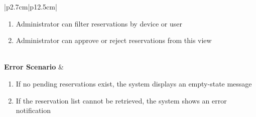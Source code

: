 \begin{table}[H]
\begin{tabular}{|p{2.7cm}|p{12.5cm}|}
\begin{minipage}[t]{\linewidth}
\begin{enumerate}[topsep=0pt,itemsep=1pt,parsep=0pt,partopsep=0pt]
                                          \item Administrator can filter reservations by device or user
                                          \item Administrator can approve or reject reservations from this view
                                      \end{enumerate}
                                  \end{minipage}      \\
        \hline
        \textbf{Error Scenario} & \begin{minipage}[t]{\linewidth}
                                      \begin{enumerate}[topsep=0pt,itemsep=1pt,parsep=0pt,partopsep=0pt]
                                          \item If no pending reservations exist, the system displays an empty-state message
                                          \item If the reservation list cannot be retrieved, the system shows an error
                                                notification
                                      \end{enumerate}
                                  \end{minipage} \\
        \hline
    \end{tabular}
    \label{tab:admin-view-pending-reservations}
\end{table}
